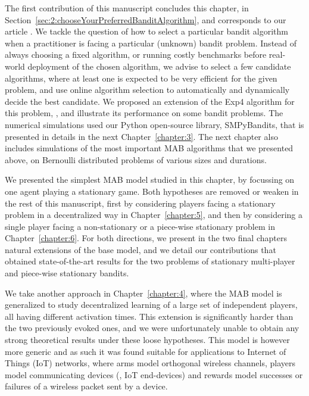 The first contribution of this manuscript concludes this chapter, in Section~\ref{sec:2:chooseYourPreferredBanditAlgorithm}, and corresponds to our article \cite{Besson2018WCNC}.
We tackle the question of how to select a particular bandit algorithm when a practitioner is facing a particular (unknown) bandit problem.
Instead of always choosing a fixed algorithm, or running costly benchmarks before real-world deployment of the chosen algorithm, we advise to select a few candidate algorithms, where at least one is expected to be very efficient for the given problem, and use online algorithm selection to automatically and dynamically decide the best candidate.
We proposed an extension of the Exp4 algorithm for this problem, \Aggr, and illustrate its performance on some bandit problems.
%
The numerical simulations used our Python open-source library, SMPyBandits, that is presented in details in the next Chapter~\ref{chapter:3}.
The next chapter also includes simulations of the most important MAB algorithms that we presented above, on Bernoulli distributed problems of various sizes and durations.

We presented the simplest MAB model studied in this chapter, by focussing on one agent playing a stationary game.
Both hypotheses are removed or weaken in the rest of this manuscript,
first by considering players facing a stationary problem in a decentralized way in Chapter~\ref{chapter:5},
and then by considering a single player facing a non-stationary or a piece-wise stationary problem in Chapter~\ref{chapter:6}.
%
For both directions, we present in the two final chapters natural extensions of the base model, and we detail our contributions that obtained state-of-the-art results for the two problems
of stationary multi-player and piece-wise stationary bandits.

We take another approach in Chapter~\ref{chapter:4}, where the MAB model is generalized to study decentralized learning of a large set of independent players, all having different activation times.
This extension is significantly harder than the two previously evoked ones, and we were unfortunately unable to obtain any strong theoretical results under these loose hypotheses.
This model is however more generic and as such it was found suitable for applications to Internet of Things (IoT) networks, where arms model orthogonal wireless channels, players model communicating devices (\ie, IoT end-devices) and rewards model successes or failures of a wireless packet sent by a device.


